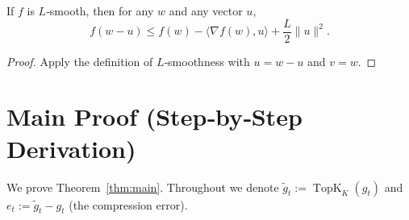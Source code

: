\documentclass{article}
\newcommand{\TopK}{\operatorname{TopK}}
\begin{document}
\begin{lemma}\label{lem:smooth}
If $f$ is $L$‑smooth, then for any $w$ and any vector $u$,
\[
f(w-u)\le f(w)-\langle\nabla f(w),u\rangle+\frac{L}{2}\|u\|^2 .
\]
\end{lemma}
\begin{proof}
Apply the definition of $L$‑smoothness with $u=w-u$ and $v=w$.
\end{proof}

\section*{Main Proof (Step‑by‑Step Derivation)}

We prove Theorem~\ref{thm:main}.  Throughout we denote
$\tilde g_t:=\TopK_K(g_t)$ and $e_t:=\tilde g_t-g_t$ (the compression error).
\end{document}
